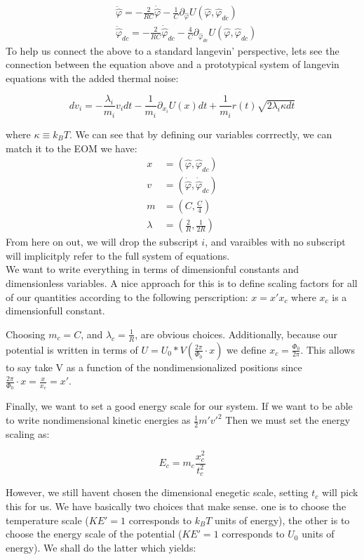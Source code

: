 \documentclass[paper=a4, twocolumn, fontsize=10pt]{article} %
\numberwithin{equation}{section} %
\numberwithin{figure}{section} %
\numberwithin{table}{section} %
\def \df#1{\hat{#1}}
\begin{document}
\begin{align}
    &\ddot{\df\varphi} = -\frac{2}{RC} \dot{\df\varphi} -\frac{1}{C} \partial_{\df\varphi} U(\df\varphi, \df\varphi_{dc})
    \\
    &\ddot{\df\varphi}_{dc} = -\frac{2}{RC} \dot{\df\varphi}_{dc} - \frac{4}{C}\partial_{\df\varphi_{dc}} U(\df\varphi, \df\varphi_{dc})
    \end{align}
To help us connect the above to a standard langevin' perspective, lets see the connection between the equation above and a prototypical system of langevin equations with the added thermal noise:

\[ dv_i = -\frac{\lambda_i}{m_i} v_i dt - \frac{1}{m_i} \partial_{x_i} U(x) dt + \frac{1}{m_i} r(t)\sqrt{2\lambda_i \kappa dt} \]

where $\kappa\equiv k_B T$. We can see that by defining our variables corrrectly, we can match it to the EOM we have:
\begin{align*}
x &=  (\df\varphi, \df\varphi_{dc}) \\
v &= (\dot{\df\varphi}, \dot{\df\varphi}_{dc}) \\
m &= ( C, \frac{C}{4}) \\
\lambda &= (\frac{2}{R}, \frac{1}{2R})
\end{align*}
From here on out, we will drop the subscript $i$, and varaibles with no subscript will implicitply refer to the full system of equations.\\

We want to write everything in terms of dimensionful constants and dimensionless variables. A nice approach for this is to define scaling factors for all of our quantities according to the following perscription: $ x = x' x_c$ where $x_c$ is a dimensionfull constant.

Choosing $m_c = C $, and $\lambda_c = \frac{1}{R}$, are obvious choices. Additionally, because our potential is written in terms of $U = U_0 * V(\frac{2\pi}{\Phi_0} \cdot x) $ we define $x_c = \frac{\Phi_0}{2\pi}$. This allows to say take V as a function of the nondimensionalized positions since $\frac{2\pi}{\Phi_0} \cdot x = \frac{x}{x_c} = x' $.


Finally, we want to set a good energy scale for our system. If we want to be able to write nondimensional kinetic energies as $\frac{1}{2} m' v'^2$ Then we must set the energy scaling as:

\[ E_c  = m_c \frac{ x^2_c}{t^2_c} \]

However, we still havent chosen the dimensional enegetic scale, setting $t_c$ will pick this for us. We have basically two choices that make sense. one is to choose the temperature scale ($KE'=1$ corresponds to $k_B T$ units of energy), the other is to choose the energy scale of the potential ($KE'=1$ corresponds to $U_0$ units of energy). We shall do the latter which yields:
\end{document}
